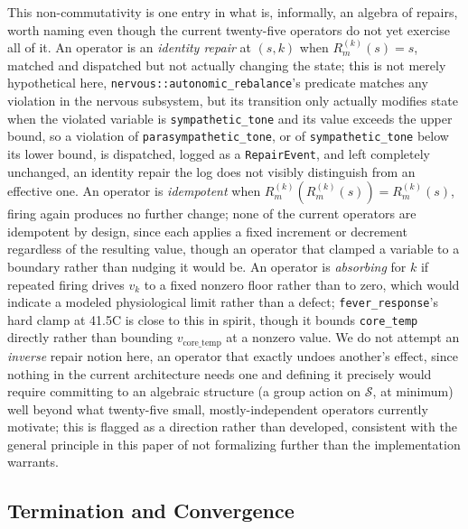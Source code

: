 \documentclass[11pt]{article}
\begin{document}
This non-commutativity is one entry in what is, informally, an algebra of repairs, worth naming even though the current twenty-five operators do not yet exercise all of it. An operator is an \emph{identity repair} at $(s, k)$ when $R_m^{(k)}(s) = s$, matched and dispatched but not actually changing the state; this is not merely hypothetical here, \texttt{nervous::autonomic\_rebalance}'s predicate matches any violation in the nervous subsystem, but its transition only actually modifies state when the violated variable is \texttt{sympathetic\_tone} and its value exceeds the upper bound, so a violation of \texttt{parasympathetic\_tone}, or of \texttt{sympathetic\_tone} below its lower bound, is dispatched, logged as a \texttt{RepairEvent}, and left completely unchanged, an identity repair the log does not visibly distinguish from an effective one. An operator is \emph{idempotent} when $R_m^{(k)}(R_m^{(k)}(s)) = R_m^{(k)}(s)$, firing again produces no further change; none of the current operators are idempotent by design, since each applies a fixed increment or decrement regardless of the resulting value, though an operator that clamped a variable to a boundary rather than nudging it would be. An operator is \emph{absorbing} for $k$ if repeated firing drives $v_k$ to a fixed nonzero floor rather than to zero, which would indicate a modeled physiological limit rather than a defect; \texttt{fever\_response}'s hard clamp at 41.5\textdegree C is close to this in spirit, though it bounds \texttt{core\_temp} directly rather than bounding $v_{\text{core\_temp}}$ at a nonzero value. We do not attempt an \emph{inverse} repair notion here, an operator that exactly undoes another's effect, since nothing in the current architecture needs one and defining it precisely would require committing to an algebraic structure (a group action on $\mathcal S$, at minimum) well beyond what twenty-five small, mostly-independent operators currently motivate; this is flagged as a direction rather than developed, consistent with the general principle in this paper of not formalizing further than the implementation warrants.

\subsection{Termination and Convergence}
\end{document}
